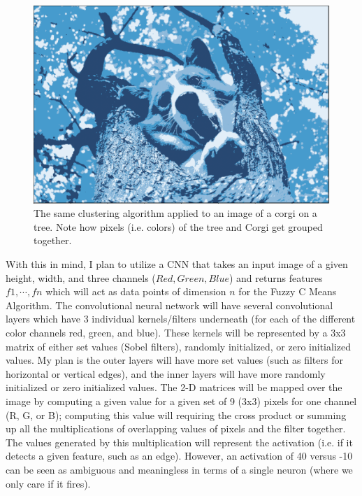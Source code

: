 \documentclass[10pt,twocolumn]{article}
\begin{document}
\begin{figure}[h]
 \centering
 \includegraphics[scale=0.2]{corgi-tree.png}
 \vspace{20px}
 \caption{The same clustering algorithm applied to an image of a corgi on a tree. Note how pixels (i.e. colors) of the tree and Corgi get grouped together.}
 \label{corgi:tree}
\end{figure}


With this in mind, I plan to utilize a CNN that takes an input image of a given height, width, and three channels (\(Red, Green, Blue\)) and returns features \( {f1, \cdots, fn} \) which will act as data points of dimension \(n \) for the Fuzzy C Means Algorithm. The convolutional neural network will have several convolutional layers which have 3 individual kernels/filters underneath (for each of the different color channels red, green, and blue). These kernels will be represented by a 3x3 matrix of either set values (Sobel filters), randomly initialized, or zero initialized values. My plan is the outer layers will have more set values (such as filters for horizontal or vertical edges), and the inner layers will have more randomly initialized or zero initialized values. The 2-D matrices will be mapped over the image by computing a given value for a given set of 9 (3x3) pixels for one channel (R, G, or B); computing this value will requiring the cross product or summing up all the multiplications of overlapping values of pixels and the filter together. The values generated by this multiplication will represent the activation (i.e. if it detects a given feature, such as an edge). However, an activation of 40 versus -10 can be seen as ambiguous and meaningless in terms of a single neuron (where we only care if it fires). 
\end{document}

